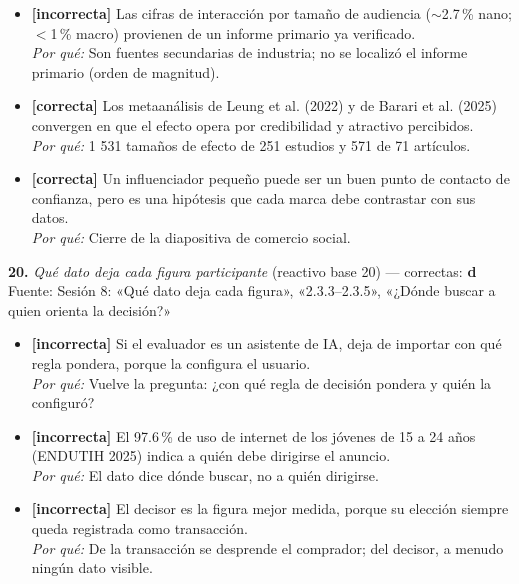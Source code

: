 \documentclass[10pt,letterpaper]{article}
\begin{document}
{\begin{itemize}[leftmargin=1.2em,itemsep=0pt,topsep=1pt,parsep=0pt]
\item[\textbf{b)}] {\footnotesize \textbf{[incorrecta]} Las cifras de interacción por tamaño de audiencia (${\sim}$2.7\,\% nano; $<$1\,\% macro) provienen de un informe primario ya verificado.\\ \textit{Por qué:} Son fuentes secundarias de industria; no se localizó el informe primario (orden de magnitud).}
\item[\textbf{c)}] {\footnotesize \textbf{[correcta]} Los metaanálisis de Leung et al. (2022) y de Barari et al. (2025) convergen en que el efecto opera por credibilidad y atractivo percibidos.\\ \textit{Por qué:} 1 531 tamaños de efecto de 251 estudios y 571 de 71 artículos.}
\item[\textbf{d)}] {\footnotesize \textbf{[correcta]} Un influenciador pequeño puede ser un buen punto de contacto de confianza, pero es una hipótesis que cada marca debe contrastar con sus datos.\\ \textit{Por qué:} Cierre de la diapositiva de comercio social.}
\end{itemize}
\vspace{3pt}\noindent\textbf{20.} \textit{Qué dato deja cada figura participante} (reactivo base 20) — correctas: \textbf{d}\\[-1pt]
{\scriptsize Fuente: Sesión 8: «Qué dato deja cada figura», «2.3.3--2.3.5», «¿Dónde buscar a quien orienta la decisión?»}
\begin{itemize}[leftmargin=1.2em,itemsep=0pt,topsep=1pt,parsep=0pt]
\item[\textbf{a)}] {\footnotesize \textbf{[incorrecta]} Si el evaluador es un asistente de IA, deja de importar con qué regla pondera, porque la configura el usuario.\\ \textit{Por qué:} Vuelve la pregunta: ¿con qué regla de decisión pondera y quién la configuró?}
\item[\textbf{b)}] {\footnotesize \textbf{[incorrecta]} El 97.6\,\% de uso de internet de los jóvenes de 15 a 24 años (ENDUTIH 2025) indica a quién debe dirigirse el anuncio.\\ \textit{Por qué:} El dato dice dónde buscar, no a quién dirigirse.}
\item[\textbf{c)}] {\footnotesize \textbf{[incorrecta]} El decisor es la figura mejor medida, porque su elección siempre queda registrada como transacción.\\ \textit{Por qué:} De la transacción se desprende el comprador; del decisor, a menudo ningún dato visible.}

\end{itemize}}
\end{document}
